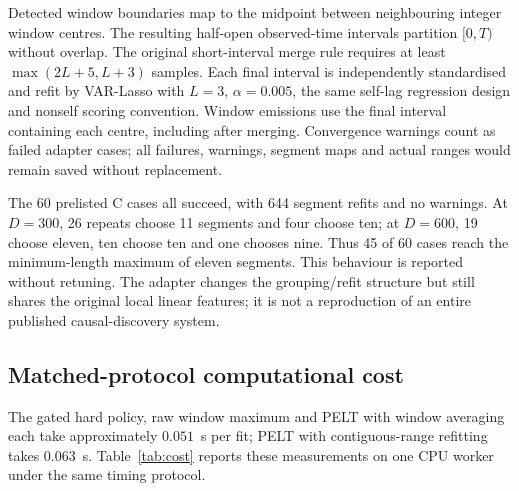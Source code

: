 \documentclass[11pt]{article}
\begin{document}
Detected window boundaries map to the midpoint between neighbouring integer
window centres. The resulting half-open observed-time intervals partition
$[0,T)$ without overlap. The original short-interval merge rule requires at
least $\max(2L+5,L+3)$ samples. Each final interval is independently
standardised and refit by VAR-Lasso with $L=3$, $\alpha=0.005$, the same
self-lag regression design and nonself scoring convention. Window emissions
use the final interval containing each centre, including after merging.
Convergence warnings count as failed adapter cases; all failures, warnings,
segment maps and actual ranges would remain saved without replacement.

The 60 prelisted C cases all succeed, with 644 segment refits and no warnings.
At $D=300$, 26 repeats choose 11 segments and four choose ten; at $D=600$,
19 choose eleven, ten choose ten and one chooses nine. Thus 45 of 60 cases
reach the minimum-length maximum of eleven segments. This behaviour is
reported without retuning. The adapter changes the grouping/refit structure
but still shares the original local linear features; it is not a reproduction
of an entire published causal-discovery system.

\begin{table}[!htbp]\centering
\caption{Segmentation/refit and hard-emission contrasts against the same raw
windows in C, 30 independent paired repeats per duration. All intervals are
ordinary pointwise $95\%$ bootstrap intervals; no new hypothesis-test family
is assigned. Standard AP and method-relative F1 are not interchangeable with
the positive-change and raw-amplitude conventions. Repeated C forced-minus-raw
within-edge temporal AUROC intervals use the original Study C summaries;
other metrics retain comparison-specific streams.}
\label{tab:external-contrasts}
\resizebox{\linewidth}{!}{}
\end{table}

\subsection{Matched-protocol computational cost}
\label{supp:runtime}
The gated hard policy, raw window maximum and PELT with window
averaging each take approximately $0.051$~s per fit; PELT with contiguous-range
refitting takes $0.063$~s. Table~\ref{tab:cost} reports these measurements on
one CPU worker under the same timing protocol.

\begin{table}[!htbp]
\centering
\caption{Wall-clock cost per fit under the same protocol, one CPU worker.}
\label{tab:cost}

\end{table}
\end{document}
